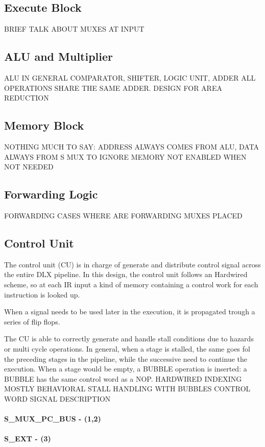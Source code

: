 \documentclass[12pt]{article}
\begin{document}
\subsection{Execute Block}
BRIEF TALK ABOUT MUXES AT INPUT
\subsection{ALU and Multiplier}
ALU IN GENERAL COMPARATOR, SHIFTER, LOGIC UNIT, ADDER
ALL OPERATIONS SHARE THE SAME ADDER. DESIGN FOR AREA REDUCTION
\subsection{Memory Block}
NOTHING MUCH TO SAY: ADDRESS ALWAYS COMES FROM ALU, DATA ALWAYS FROM S
MUX TO IGNORE MEMORY
NOT ENABLED WHEN NOT NEEDED

\subsection{Forwarding Logic}
FORWARDING CASES
WHERE ARE FORWARDING MUXES PLACED


\subsection{Control Unit}
The control unit (CU) is in charge of generate and distribute control signal across the entire DLX pipeline.
In this design, the control unit follows an Hardwired scheme, so at each IR input a kind of memory containing a control work for each instruction is looked up.

When a signal needs to be used later in the execution, it is propagated trough a series of flip flops.

The CU is able to correctly generate and handle stall conditions due to hazards or multi cycle operations. In general, when a stage is stalled, the same goes fol the preceding stages in the pipeline, while the successive need to continue the execution. When a stage would be empty, a BUBBLE operation is inserted: a BUBBLE has the same control word as a NOP.
HARDWIRED
INDEXING
MOSTLY BEHAVIORAL
STALL HANDLING WITH BUBBLES
CONTROL WORD SIGNAL DESCRIPTION
\paragraph{S\_MUX\_PC\_BUS - (1,2)}
\paragraph{S\_EXT - (3)}
\end{document}
